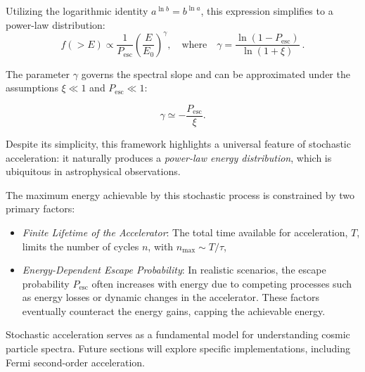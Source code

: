 Utilizing the logarithmic identity \( a^{\ln b} = b^{\ln a} \), this expression simplifies to a power-law distribution:
\begin{equation}
f(>E) \propto \frac{1}{P_{\text{esc}}} \left( \frac{E}{E_0} \right)^{\gamma}, \quad \text{where} \quad \gamma = \frac{\ln (1-P_{\text{esc}})}{\ln (1+\xi)}~.
\end{equation}

The parameter \( \gamma \) governs the spectral slope and can be approximated under the assumptions \( \xi \ll 1 \) and \( P_{\text{esc}} \ll 1 \):
\begin{remark}
\begin{equation}\label{eq:gammapescxi}
\gamma \simeq -\frac{P_{\text{esc}}}{\xi}.
\end{equation}
\end{remark}

Despite its simplicity, this framework highlights a universal feature of stochastic acceleration: it naturally produces a \emph{power-law energy distribution}, which is ubiquitous in astrophysical observations.  

The maximum energy achievable by this stochastic process is constrained by two primary factors:
\begin{itemize}
\item \emph{Finite Lifetime of the Accelerator}: The total time available for acceleration, \( T \), limits the number of cycles \( n \), with \( n_{\text{max}} \sim T / \tau \),
\item \emph{Energy-Dependent Escape Probability}: In realistic scenarios, the escape probability \( P_{\text{esc}} \) often increases with energy due to competing processes such as energy losses or dynamic changes in the accelerator. These factors eventually counteract the energy gains, capping the achievable energy.
\end{itemize}

Stochastic acceleration serves as a fundamental model for understanding cosmic particle spectra. Future sections will explore specific implementations, including Fermi second-order acceleration.